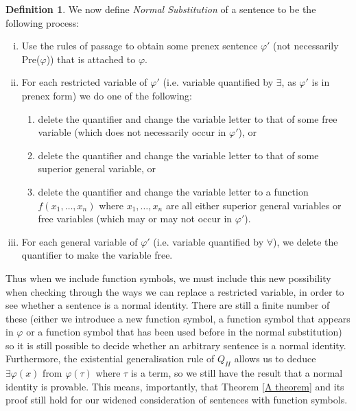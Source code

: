 \documentclass[a4paper,12pt]{report}
\theoremstyle{definition}
\newtheorem{mydef}[lem]{Definition}
\begin{document}
\begin{mydef}
We now define \emph{Normal Substitution} of a sentence to be the following process:
\begin{enumerate}[(i)]
\item Use the rules of passage to obtain some prenex sentence $\varphi'$ (not necessarily Pre($\varphi$)) that is attached to $\varphi$. 
\item For each restricted variable of $\varphi'$ (i.e. variable quantified by $\exists$, as $\varphi'$ is in prenex form) we do one of the following:
\begin{enumerate} 	
\item delete the quantifier and change the variable letter to that of some free variable (which does not necessarily occur in $\varphi'$), or
\item delete the quantifier and change the variable letter to that of some superior general variable, or
\item delete the quantifier and change the variable letter to a function $f(x_1, \ldots , x_n)$ where $x_1, \ldots , x_n$ are all either superior general variables or free variables (which may or may not occur in $\varphi'$).
\end{enumerate}
\item For each general variable of $\varphi'$ (i.e. variable quantified by $\forall$), we delete the quantifier to make the variable free.
\end{enumerate}
\end{mydef}

Thus when we include function symbols, we must include this new possibility when checking through the ways we can replace a restricted variable, in order to see whether a sentence is a normal identity. There are still a finite number of these (either we introduce a new function symbol, a function symbol that appears in $\varphi$ or a function symbol that has been used before in the normal substitution) so it is still possible to decide whether an arbitrary sentence is a normal identity. Furthermore, the existential generalisation rule of $Q_H$  allows us to deduce $\exists \varphi(x)$ from $\varphi(\tau)$ where $\tau$ is a term, so we still have the result that a normal identity is provable. This means, importantly, that Theorem \ref{A theorem} and its proof still hold for our widened consideration of sentences with function symbols.
\end{document}
